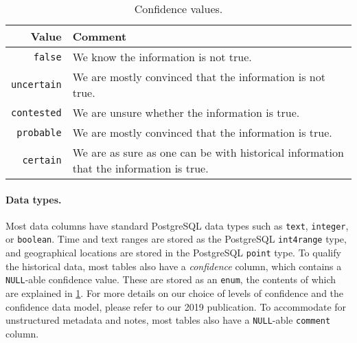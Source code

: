\begin{table}[htb]
  \centering
  \caption{Confidence values.}
  \label{table:confidence-values}
  \begin{tabular}{@{}rl@{}}
    \toprule
    Value & Comment \\
    \midrule
    \verb!false! & We know the information is not true. \\
    \verb!uncertain! & We are mostly convinced that the information is not true. \\
    \verb!contested! & We are unsure whether the information is true. \\
    \verb!probable! & We are mostly convinced that the information is true. \\
    \verb!certain! & We are as sure as one can be with historical information that the information is true. \\
    \bottomrule
  \end{tabular}
\end{table}

\paragraph*{Data types.}
Most data columns have standard PostgreSQL data types such as \verb!text!, \verb!integer!, or \verb!boolean!.
Time and text ranges are stored as the PostgreSQL \verb!int4range! type, and geographical locations are stored in the PostgreSQL \verb!point! type.
To qualify the historical data, most tables also have a \emph{confidence} column, which contains a \verb!NULL!-able confidence value.
These are stored as an \verb!enum!, the contents of which are explained in \cref{table:confidence-values}.
For more details on our choice of levels of confidence and the confidence data model, please refer to our 2019 publication.
To accommodate for unstructured metadata and notes, most tables also have a \verb!NULL!-able \verb!comment! column.


